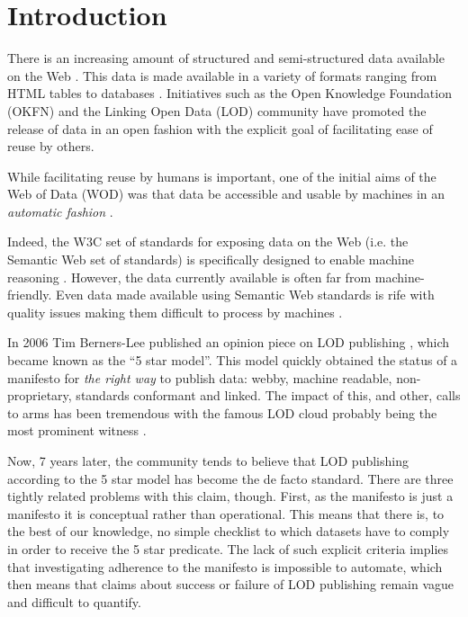 \section{Introduction}
\label{sec:intro}

There is an increasing amount of structured and semi-structured data
 available on the Web \cite{Dalvi:2012:ASD:2180912.2180920}.
This data is made available in a variety of formats ranging from
 HTML tables to databases \cite{Adelfio:2013:SET:2536336.2536343}.
Initiatives such as the Open Knowledge Foundation (OKFN) and
 the Linking Open Data (LOD) community have promoted the release of data
 in an open fashion with the explicit goal of facilitating
 ease of reuse by others.

While facilitating reuse by humans is important,
 one of the initial aims of the Web of Data (WOD)
 was that data be accessible and usable by machines in an
 {\em automatic fashion} \cite{Lee2001}.

Indeed, the W3C set of standards for exposing data on the Web
 (i.e. the Semantic Web set of standards) is specifically designed
 to enable machine reasoning \cite{Hayes2004}.
However, the data currently available is often far from machine-friendly.
Even data made available using Semantic Web standards is rife with
 quality issues making them difficult to process
 by machines \cite{DBLP:conf/www/HoganHPDP10}.

In 2006 Tim Berners-Lee published
 an opinion piece on LOD publishing \cite{Bernerslee2006},
 which became known as the ``5 star model''.
This model quickly obtained the status of a manifesto
 for \emph{the right way} to publish data:
 webby, machine readable, non-proprietary,
 standards conformant and linked.
The impact of this, and other, calls to arms has been tremendous
 with the famous LOD cloud probably being
 the most prominent witness \cite{deri_2011}.

Now, 7 years later, the community tends to believe that
 LOD publishing according to the 5 star model
 has become the de facto standard.
There are three tightly related problems with this claim, though.
First, as the manifesto is just a manifesto it is conceptual
 rather than operational.
This means that there is, to the best of our knowledge,
 no simple checklist to which datasets have to comply
 in order to receive the 5 star predicate.
The lack of such explicit criteria implies that investigating adherence
 to the manifesto is impossible to automate, which then means
 that claims about success or failure of LOD publishing
 remain vague and difficult to quantify.

